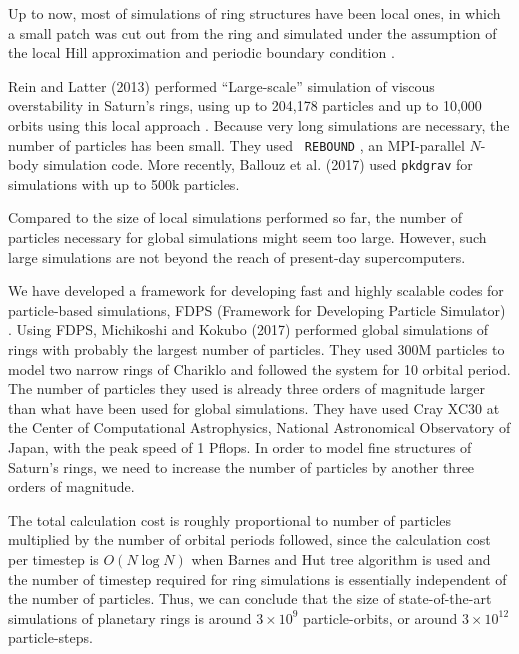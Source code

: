 \documentclass[oribibl]{llncs}
\begin{document}
Up to now, most of simulations of ring structures have been local
ones, in which a small patch was cut out from the ring and simulated
under the assumption of the local Hill approximation and periodic
boundary condition \cite{1988AJ.....95..925W}.

Rein and Latter (2013) performed ``Large-scale'' simulation of viscous
overstability in Saturn's rings, using up to 204,178 particles and up
to 10,000 orbits using this local approach
\cite{2013MNRAS.431..145R}. Because very long simulations are
necessary, the number of particles has been small. They used {\tt
  REBOUND} \cite{2012A&A...537A.128R} , an MPI-parallel $N$-body
simulation code. More recently, Ballouz et al. (2017)
\cite{2017AJ....153..146B} used {\tt pkdgrav}
\cite{2001PhDT........21S} for simulations with up to 500k particles.

Compared to the size of local simulations performed so far, the number
of particles necessary for global simulations might seem too
large. However, such large simulations are not beyond the reach of
present-day supercomputers.

We have developed a framework for developing fast and highly scalable
codes for particle-based simulations, FDPS (Framework for Developing
Particle Simulator) \cite{2016PASJ...68...54I}. Using FDPS, Michikoshi
and Kokubo (2017) \cite{2017ApJ...837L..13M} performed global
simulations of rings with probably the largest number of
particles. They used 300M particles to model two narrow rings of
Chariklo and followed the system for 10 orbital period. The number of
particles they used is already three orders of magnitude larger than
what have been used for global simulations. They have used Cray XC30
at the Center of Computational Astrophysics, National Astronomical
Observatory of Japan, with the peak speed of 1 Pflops. In order to
model fine structures of Saturn's rings, we need to increase the
number of particles by another three orders of magnitude.

The total calculation cost is roughly proportional to number of
particles multiplied by the number of orbital periods followed, since
the calculation cost per timestep is $O(N \log N)$ when Barnes and Hut
tree algorithm is used and the number of timestep required for ring
simulations is essentially independent of the number of
particles. Thus, we can conclude that the size of state-of-the-art
simulations of planetary rings is around $3 \times 10^9$
particle-orbits, or around $3 \times 10^{12}$ particle-steps.
\end{document}
